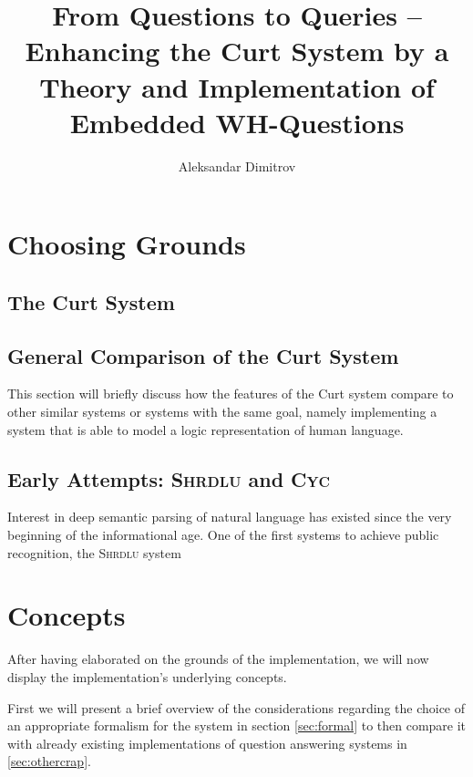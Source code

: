 \documentclass{scrartcl}
\author{Aleksandar Dimitrov}
\title{From Questions to Queries -- Enhancing the Curt System by a Theory and Implementation of Embedded WH-Questions}
\newcommand{\pn}{\textsc}
\begin{document}
\maketitle
\tableofcontents

\section{Choosing Grounds} %

\subsection{The Curt System}

\subsection{General Comparison of the Curt System}

This section will briefly discuss how the features of the Curt system compare to
other similar systems or systems with the same goal, namely implementing a
system that is able to model a logic representation of human language.

\subsection{Early Attempts: \pn{Shrdlu} and \pn{Cyc}}

Interest in deep semantic parsing of natural language has existed since the very
beginning of the informational age. One of the first systems to achieve public
recognition, the \pn{Shrdlu} system 


\section{Concepts}

After having elaborated on the grounds of the implementation, we will now
display the implementation's underlying concepts. %


First we will present a brief overview of the considerations regarding the
choice of an appropriate formalism for the system in section \ref{sec:formal}
to then compare it with already existing implementations of question answering
systems in \ref{sec:othercrap}.
\end{document}
